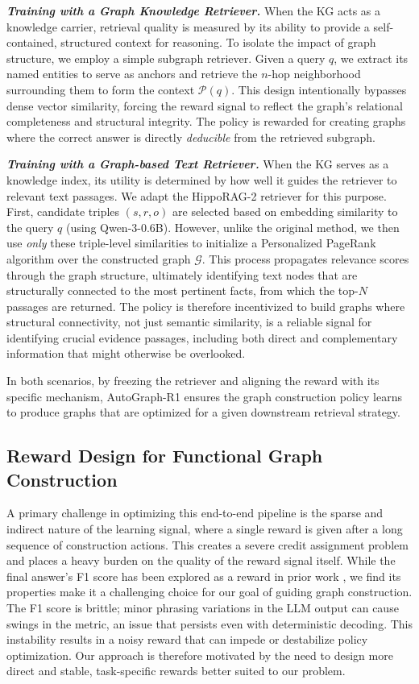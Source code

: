 \documentclass[11pt]{article}
\begin{document}
\textit{\textbf{Training with a Graph Knowledge Retriever.}} When the KG acts as a knowledge carrier, retrieval quality is measured by its ability to provide a self-contained, structured context for reasoning. To isolate the impact of graph structure, we employ a simple subgraph retriever. Given a query $q$, we extract its named entities to serve as anchors and retrieve the $n$-hop neighborhood surrounding them to form the context $\mathcal{P}(q)$. This design intentionally bypasses dense vector similarity, forcing the reward signal to reflect the graph's relational completeness and structural integrity. The policy is rewarded for creating graphs where the correct answer is directly \emph{deducible} from the retrieved subgraph.

\textit{\textbf{Training with a Graph-based Text Retriever.}} When the KG serves as a knowledge index, its utility is determined by how well it guides the retriever to relevant text passages. We adapt the HippoRAG-2 retriever \citep{gutierrez_rag_2025} for this purpose. First, candidate triples $(s,r,o)$ are selected based on embedding similarity to the query $q$ (using Qwen-3-0.6B). However, unlike the original method, we then use \emph{only} these triple-level similarities to initialize a Personalized PageRank algorithm over the constructed graph $\mathcal{G}$. This process propagates relevance scores through the graph structure, ultimately identifying text nodes that are structurally connected to the most pertinent facts, from which the top-$N$ passages are returned. The policy is therefore incentivized to build graphs where structural connectivity, not just semantic similarity, is a reliable signal for identifying crucial evidence passages, including both direct and complementary information that might otherwise be overlooked.

\medskip
In both scenarios, by freezing the retriever and aligning the reward with its specific mechanism, AutoGraph-R1 ensures the graph construction policy learns to produce graphs that are optimized for a given downstream retrieval strategy.


\subsection{Reward Design for Functional Graph Construction}
A primary challenge in optimizing this end-to-end pipeline is the sparse and indirect nature of the learning signal, where a single reward is given after a long sequence of construction actions. This creates a severe credit assignment problem and places a heavy burden on the quality of the reward signal itself. While the final answer's F1 score has been explored as a reward in prior work \citep{jin_search-r1_2025}, we find its properties make it a challenging choice for our goal of guiding graph construction. The F1 score is brittle; minor phrasing variations in the LLM output can cause swings in the metric, an issue that persists even with deterministic decoding. This instability results in a noisy reward that can impede or destabilize policy optimization. Our approach is therefore motivated by the need to design more direct and stable, task-specific rewards better suited to our problem.
\end{document}
